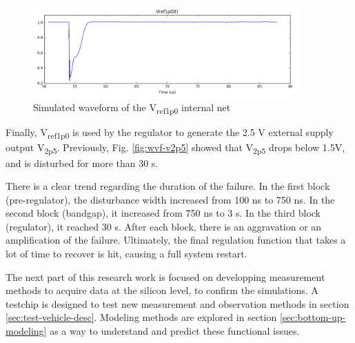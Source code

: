 \begin{figure}[!h]
  \centering
  \includegraphics[width=0.9\textwidth]{src/3/figures/v1p0.png}
  \caption{Simulated waveform of the V\textsubscript{ref1p0} internal net}
  \label{fig:wvf-v1p0}
\end{figure}

Finally, V\textsubscript{ref1p0} is used by the regulator to generate the 2.5 V external supply output V\textsubscript{2p5}.
Previously,  Fig. \ref{fig:wvf-v2p5} showed that V\textsubscript{2p5} drops below 1.5V, and is disturbed for more than 30 \textmugreek{}s.

There is a clear trend regarding the duration of the failure.
In the first block (pre-regulator), the disturbance width increased from 100 ns to 750 ns.
In the second block (bandgap), it increased from 750 ns to 3 \textmugreek{}s.
In the third block (regulator), it reached 30 \textmugreek{}s.
After each block, there is an aggravation or an amplification of the failure.
Ultimately, the final regulation function that takes a lot of time to recover is hit, causing a full system restart.

The next part of this research work is focused on developping measurement methods to acquire data at the silicon level, to confirm the simulations.
A testchip is designed to test new measurement and observation methods in section \ref{sec:test-vehicle-desc}.
Modeling methods are explored in section \ref{sec:bottom-up-modeling} as a way to understand and predict these functional issues.

